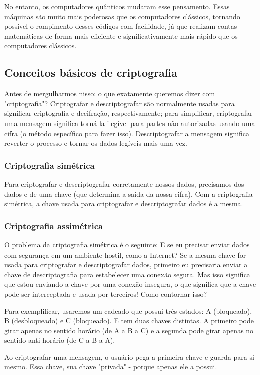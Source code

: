 No entanto, os computadores quânticos mudaram esse pensamento. Essas máquinas são muito mais poderosas que os computadores clássicos, tornando possível o rompimento desses códigos com facilidade, já que realizam contas matemáticas de forma mais eficiente e significativamente mais rápido que os computadores clássicos.

\subsection{Conceitos básicos de criptografia}
Antes de mergulharmos nisso: o que exatamente queremos dizer com "criptografia"? Criptografar e descriptografar são normalmente usadas para significar criptografia e decifração, respectivamente; para simplificar, criptografar uma mensagem significa torná-la ilegível para partes não autorizadas usando uma cifra (o método específico para fazer isso). Descriptografar a mensagem significa reverter o processo e tornar os dados legíveis mais uma vez.

\subsubsection{Criptografia simétrica}
Para criptografar e descriptografar corretamente nossos dados, precisamos dos dados e de uma chave (que determina a saída da nossa cifra).
Com a criptografia simétrica, a chave usada para criptografar e descriptografar dados é a mesma.

\subsubsection{Criptografia assimétrica}
O problema da criptografia simétrica é o seguinte: E se eu precisar enviar dados com segurança em um ambiente hostil, como a Internet? Se a mesma chave for usada para criptografar e descriptografar dados, primeiro eu precisaria enviar a chave de descriptografia para estabelecer uma conexão segura. Mas isso significa que estou enviando a chave por uma conexão insegura, o que significa que a chave pode ser interceptada e usada por terceiros! Como contornar isso? 

Para exemplificar, usaremos um cadeado que possui três estados: A (bloqueado), B (desbloqueado) e C (bloqueado).
E tem duas chaves distintas. A primeiro pode girar apenas no sentido horário (de A a B a C) e a segunda pode girar apenas no sentido anti-horário (de C a B a A).

Ao criptografar uma mensagem, o usuário pega a primeira chave e guarda para si mesmo. Essa chave, sua chave "privada" - porque apenas ele a possui.

